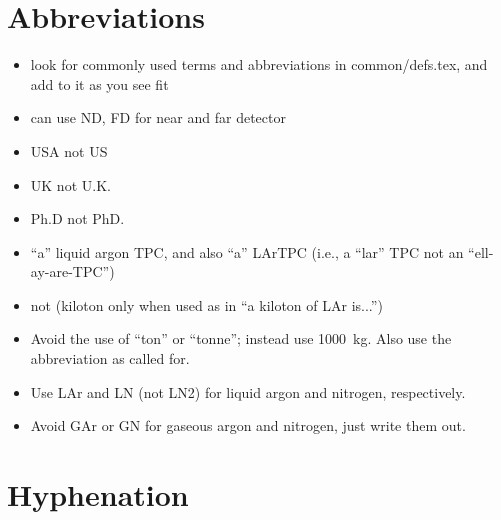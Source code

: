 \section{Abbreviations}
\label{sec:english-abbrevs}

\begin{itemize}
\item look for commonly used terms and abbreviations in common/defs.tex, and add to it as you see fit 
\item can use ND, FD for near and far detector
\item USA not US
\item UK not U.K. 
\item Ph.D not PhD.
\item ``a'' liquid argon TPC, and also ``a'' LArTPC (i.e., a ``lar'' TPC not an ``ell-ay-are-TPC'') 
\item \si{\kt} not \si{\kton} (kiloton only when used as in ``a kiloton of LAr is...'') 
\item Avoid the use of ``ton'' or ``tonne''; instead use \SI{1000}{\kilo\gram}. Also use the abbreviation \si{\kt} as called for.
\item Use LAr and LN (not LN2) for liquid argon and nitrogen, respectively. 
\item Avoid GAr or GN for gaseous argon and nitrogen, just write them out.
\end{itemize}

\section{Hyphenation}
\label{sec:english-hyphen}

